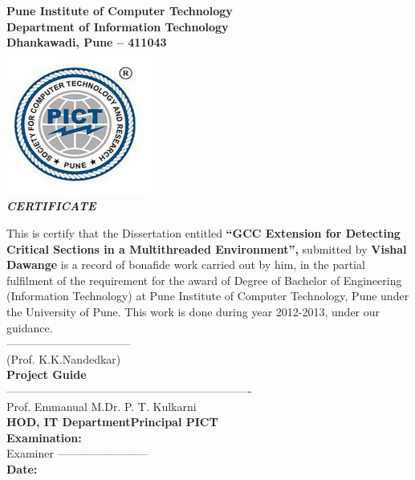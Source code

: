 \begin{center}
\thispagestyle{empty}

\LARGE{\textbf{Pune Institute of Computer Technology}} \\
\large{\textbf{Department of Information Technology}}\\
\large{\textbf{Dhankawadi, Pune – 411043}}\\[0.5cm]

\includegraphics[scale=0.5]{pict_logo}\\[0.5cm]

{\Huge \textbf{\emph{CERTIFICATE}}}\\[0.5cm]
\end{center}
\linespread{1.13}
\large{This is certify that the Dissertation entitled
\textbf{``GCC Extension for Detecting Critical Sections in a Multithreaded Environment'',}
submitted by
\textbf{Vishal Dawange}
 is a record of bonafide work carried out by him, in the partial
 fulfilment of the requirement for the award of Degree of Bachelor of
 Engineering (Information Technology) at Pune Institute of Computer
 Technology, Pune under the University of Pune. This work is done
 during year 2012-2013, under our guidance.}\\[1.0cm]
\large{---------------------------------}\\
\large{(Prof. K.K.Nandedkar)}\\[0.3cm]
\textbf{Project Guide}\\[1.0cm]
\large{--------------------------------}\hspace*{1.5in}\large{----------------------------------}\\
\large{Prof. Emmanual M.}\hspace*{2.0in}\large{Dr. P. T. Kulkarni}\\[0.3cm]
\textbf{HOD, IT Department}\hspace*{1.73in}\textbf{Principal PICT}\\[0.5cm]
\Large{\textbf{Examination:}}\\[0.8cm]
\large{Examiner ------------------------}\\[0.8cm]
\Large{\textbf{Date:}}
\newpage
